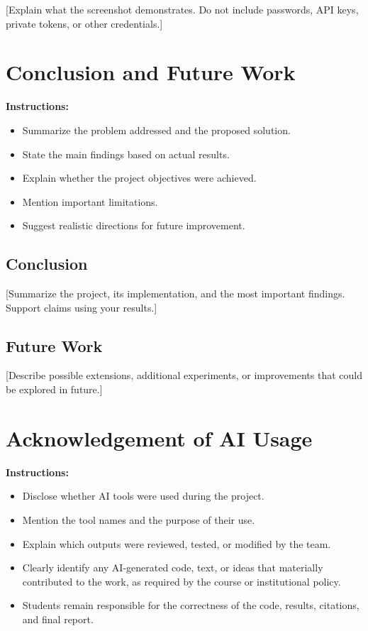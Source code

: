 \documentclass[12pt,a4paper]{report}
\begin{document}
[Explain what the screenshot demonstrates. Do not include
passwords, API keys, private tokens, or other credentials.]

\chapter{Conclusion and Future Work}

\textbf{Instructions:}
\begin{itemize}
    \item Summarize the problem addressed and the proposed solution.
    \item State the main findings based on actual results.
    \item Explain whether the project objectives were achieved.
    \item Mention important limitations.
    \item Suggest realistic directions for future improvement.
\end{itemize}

\section{Conclusion}

[Summarize the project, its implementation, and the
most important findings. Support claims using your results.]

\section{Future Work}

[Describe possible extensions, additional experiments,
or improvements that could be explored in future.]

\chapter{Acknowledgement of AI Usage}

\textbf{Instructions:}
\begin{itemize}
    \item Disclose whether AI tools were used during the project.
    \item Mention the tool names and the purpose of their use.
    \item Explain which outputs were reviewed, tested, or modified
    by the team.
    \item Clearly identify any AI-generated code, text, or ideas
    that materially contributed to the work, as required by
    the course or institutional policy.
    \item Students remain responsible for the correctness of
    the code, results, citations, and final report.
\end{itemize}
\end{document}
